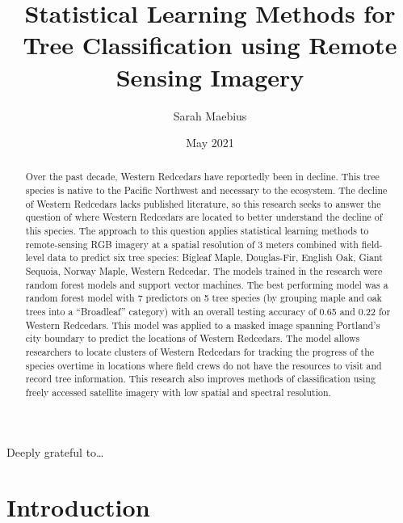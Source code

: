 \documentclass[12pt,twoside]{reedthesis}
\title{Statistical Learning Methods for Tree Classification using Remote Sensing Imagery}
\author{Sarah Maebius}
\date{May 2021}
\begin{document}
  \maketitle

\frontmatter %
\pagestyle{empty} %
  \begin{acknowledgements}
    Deeply grateful to\ldots{}
  \end{acknowledgements}

  \hypersetup{linkcolor=black}
  \setcounter{tocdepth}{2}
  \tableofcontents

  \listoftables

  \listoffigures
  \begin{abstract}
    Over the past decade, Western Redcedars have reportedly been in decline. This tree species is native to the Pacific Northwest and necessary to the ecosystem. The decline of Western Redcedars lacks published literature, so this research seeks to answer the question of where Western Redcedars are located to better understand the decline of this species. The approach to this question applies statistical learning methods to remote-sensing RGB imagery at a spatial resolution of 3 meters combined with field-level data to predict six tree species: Bigleaf Maple, Douglas-Fir, English Oak, Giant Sequoia, Norway Maple, Western Redcedar. The models trained in the research were random forest models and support vector machines. The best performing model was a random forest model with 7 predictors on 5 tree species (by grouping maple and oak trees into a ``Broadleaf'' category) with an overall testing accuracy of 0.65 and 0.22 for Western Redcedars. This model was applied to a masked image spanning Portland's city boundary to predict the locations of Western Redcedars. The model allows researchers to locate clusters of Western Redcedars for tracking the progress of the species overtime in locations where field crews do not have the resources to visit and record tree information. This research also improves methods of classification using freely accessed satellite imagery with low spatial and spectral resolution.
  \end{abstract}

\mainmatter %
\pagestyle{fancyplain} %

\hypertarget{introduction}{%
\chapter*{Introduction}\label{introduction}}
\end{document}
